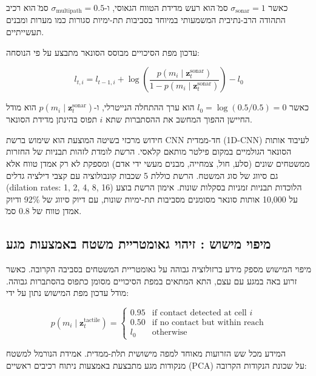 כאשר $\sigma_{\text{sonar}} = 1$ ס\"מ הוא רעש מדידת הטווח הגאוסי, ו-$\sigma_{\text{multipath}} = 0.5$ ס\"מ הוא רכיב התהודה הרב-נתיבית המשמעותי במיוחד בסביבות תת-ימיות סגורות כמו מערות ומבנים תעשייתיים.

עדכון מפת הסיכויים מבוסס הסונאר מתבצע על פי הנוסחה:

\begin{equation}
l_{t,i} = l_{t-1,i} + \log\left( \frac{p(m_i \mid \mathbf{z}_t^{\text{sonar}})}{1 - p(m_i \mid \mathbf{z}_t^{\text{sonar}})} \right) - l_0
\label{eq:ch07_sonar_occupancy}
\end{equation}

כאשר $l_0 = \log(0.5/0.5) = 0$ הוא ערך ההתחלה הנייטרלי, ו-$p(m_i \mid \mathbf{z}_t^{\text{sonar}})$ הוא מודל החיישן ההפוך המחשב את ההסתברות שתא $i$ תפוס בהינתן מדידת הסונאר.

חידוש מרכזי בשיטה המוצעת הוא שימוש ברשת CNN חד-ממדית (1D-CNN) לעיבוד אותות הסונאר הגולמיים במקום פילטר מותאם קלאסי. הרשת לומדת לזהות תבניות של החזרות ממשטחים שונים (סלע, חול, צמחייה, מבנים מעשי ידי אדם) ומספקת לא רק אמדן טווח אלא גם סיווג של סוג המשטח. הרשת כוללת 5 שכבות קונבולוציה עם קצבי דילציה גדלים (dilation rates: 1, 2, 4, 8, 16) הלוכדות תבניות זמניות בסקלות שונות. אימון הרשת בוצע על 10,000 אותות סונאר מסומנים מסביבות תת-ימיות שונות, עם דיוק סיווג של 92\% ודיוק אמדן טווח של 0.8 ס\"מ.

\subsection{מיפוי מישוש : זיהוי גאומטריית משטח באמצעות מגע}
\label{sec:ch07_tactile_mapping}

מיפוי המישוש מספק מידע ברזולוציה גבוהה על גאומטריית המשטחים בסביבה הקרובה. כאשר זרוע באה במגע עם עצם, התא המתאים במפת הסיכויים מסומן כתפוס בהסתברות גבוהה. מודל עדכון מפת המישוש נתון על ידי:

\begin{equation}
p(m_i \mid \mathbf{z}_t^{\text{tactile}}) = \begin{cases} 0.95 & \text{if contact detected at cell } i \\ 0.50 & \text{if no contact but within reach} \\ l_0 & \text{otherwise} \end{cases}
\label{eq:ch07_tactile_occupancy}
\end{equation}

המידע מכל שש הזרועות מאוחד למפה מישושית תלת-ממדית. אמידת הנורמל למשטח מנקודות מגע מתבצעת באמצעות ניתוח רכיבים ראשיים (PCA) על שכונת הנקודות הקרובה:


